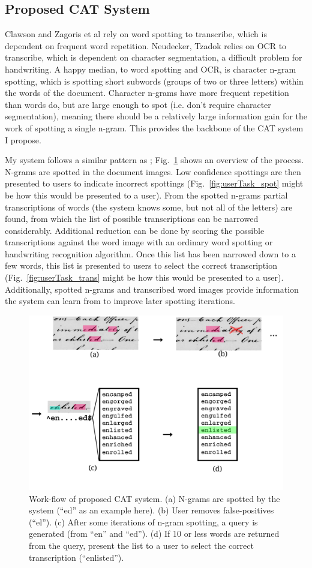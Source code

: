 \documentclass[conference]{IEEEtran}
\begin{document}
{\subsection{Proposed CAT System}
Clawson\cite{Clawson2014} and Zagoris et al\cite{Zagoris2015} rely on word spotting to transcribe, which is dependent on frequent word repetition. Neudecker, Tzadok\cite{Neudecker2010} relies on OCR to transcribe, which is dependent on character segmentation, a difficult problem for handwriting.
A happy median, to word spotting and OCR, is character n-gram spotting, which is spotting short subwords (groups of two or three letters) within the words of the document. Character n-grams have more frequent repetition than words do, but are large enough to spot (i.e. don't require character segmentation), meaning there should be a relatively large information gain for the work of spotting a single n-gram. This provides the backbone of the CAT system I propose.


My system follows a similar pattern as \cite{Neudecker2010}; Fig.~\ref{fig:system_diagram} shows an overview of the process. N-grams are spotted in the document images. Low confidence spottings are then presented to users to indicate incorrect spottings (Fig.~\ref{fig:userTask_spot} might be how this would be presented to a user). From the spotted n-grams partial transcriptions of words (the system knows some, but not all of the letters) are found, from which the list of possible transcriptions can be narrowed considerably. Additional reduction can be done by scoring the possible transcriptions against the word image with an ordinary word spotting or handwriting recognition algorithm. Once this list has been narrowed down to a few words, this list is presented to users to select the correct transcription (Fig.~\ref{fig:userTask_trans} might be how this would be presented to a user). Additionally, spotted n-grams and transcribed word images provide information the system can learn from to improve later spotting iterations.

\begin{figure}
    \centering
    \includegraphics[width=.45\textwidth]{flow5}
    \caption{Work-flow of proposed CAT system. (a) N-grams are spotted by the system (``ed'' as an example here). (b) User removes false-positives (``el''). (c) After some iterations of n-gram spotting, a query is generated (from ``en'' and ``ed''). (d) If 10 or less words are returned from the query, present the list to a user to select the correct transcription (``enlisted'').}
    \label{fig:system_diagram}
\end{figure}

}
\end{document}
